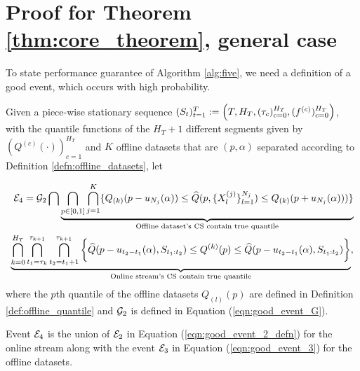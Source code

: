 \section{Proof for Theorem \ref{thm:core_theorem}, general case}
{\color{black}



To state performance guarantee of Algorithm \ref{alg:five}, we need a definition of a good event, which occurs with high probability.
\begin{definition} 
Given a piece-wise stationary sequence $(S_t)_{t=1}^T := \Bigl(T,H_T, (\tau_c)_{c=0}^{H_T}, (f^{(c)})_{c=0}^{H_T}\Bigr)$, with the quantile functions of the $H_T+1$ different segments given by $(Q^{(c)}(\cdot))_{c=1}^{H_T}$ and $K$ offline datasets that are $(p,\alpha)$ separated according to Definition \ref{defn:offline_datasets}, let


\begin{align}
\begin{split}
    {\mathcal{E}}_4 = {\mathcal{G}}_2 \bigcap \underbrace{\bigcap_{p \in [0,1]}\bigcap_{j=1}^{K} \{ Q_{(k)}(p-u_{N_j}(\alpha)) \leq \widehat{Q}(p, \{ X_l^{(j)} \}_{l=1}^{N_j} ) \leq  Q_{(k)}(p+u_{N_j}(\alpha)) ) \}}_{\text{Offline dataset's CS contain true quantile}}   \\ \underbrace{\bigcap_{k=0}^{H_T}\bigcap_{t_1 = \tau_{k}}^{\tau_{k+1}} \bigcap_{t_2 = t_1 +1}^{\tau_{k+1}}   \bigg\{ \widehat{Q}(p-u_{t_2 - t_1}(\alpha), S_{t_1:t_2})  \leq Q^{(k)}(p) \leq \widehat{Q}(p-u_{t_2 - t_1}(\alpha), S_{t_1:t_2}) \bigg\}}_{\text{Online stream's CS contain true quantile}},
        \end{split}
                \label{eqn:good_event_4_defn}
\end{align}
where the $p$th quantile of the offline datasets $Q_{(l)}(p)$ are defined in Definition \ref{def:offline_quantile} and ${\mathcal{G}}_2$ is defined in Equation (\ref{eqn:good_event_G}). 
\end{definition}

%
Event ${\mathcal{E}}_4$ is the union of ${\mathcal{E}}_2$ in Equation (\ref{eqn:good_event_2_defn}) for the online stream along with the event ${\mathcal{E}}_3$ in Equation (\ref{eqn:good_event_3}) for the offline datasets. %

}
